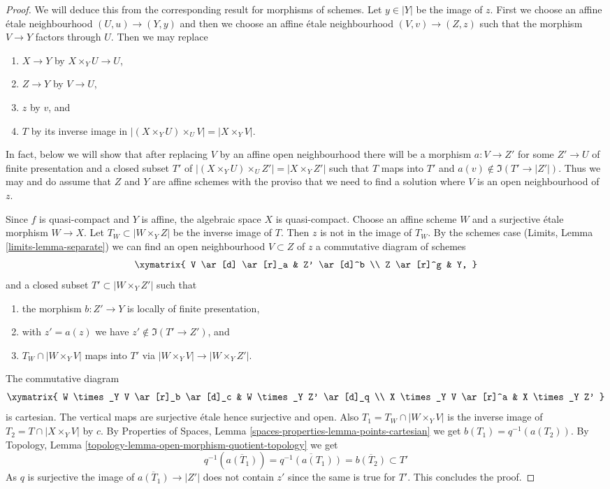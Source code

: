 \begin{proof}
We will deduce this from the corresponding result for morphisms of schemes.
Let $y \in |Y|$ be the image of $z$. First we choose an affine \'etale
neighbourhood $(U, u) \to (Y, y)$ and then we choose an affine \'etale
neighbourhood $(V, v) \to (Z, z)$ such that the morphism $V \to Y$
factors through $U$. Then we may replace
\begin{enumerate}
\item $X \to Y$ by $X \times_Y U \to U$,
\item $Z \to Y$ by $V \to U$,
\item $z$ by $v$, and
\item $T$ by its inverse image in
$|(X \times_Y U) \times_U V| = |X \times_Y V|$.
\end{enumerate}
In fact, below we will show that after replacing $V$ by an affine
open neighbourhood there will be a morphism $a : V \to Z'$ for
some $Z' \to U$ of finite presentation and a closed subset $T'$
of $|(X \times_Y U) \times_U Z'| = |X \times_Y Z'|$ such that
$T$ maps into $T'$ and $a(v) \not \in \Im(T' \to |Z'|)$.
Thus we may and do assume that $Z$ and $Y$ are affine schemes
with the proviso that we need to find a solution where $V$
is an open neighbourhood of $z$.

\medskip\noindent
Since $f$ is quasi-compact and $Y$ is affine, the algebraic space
$X$ is quasi-compact. Choose an affine scheme $W$ and a surjective
\'etale morphism $W \to X$. Let $T_W \subset |W \times_Y Z|$
be the inverse image of $T$. Then $z$ is not in the image of
$T_W$. By the schemes case (Limits, Lemma \ref{limits-lemma-separate})
we can find an open neighbourhood $V \subset Z$ of $z$
a commutative diagram of schemes
$$
\xymatrix{
V \ar[d] \ar[r]_a & Z' \ar[d]^b \\
Z \ar[r]^g & Y,
}
$$
and a closed subset $T' \subset |W \times_Y Z'|$ such that
\begin{enumerate}
\item the morphism $b : Z' \to Y$ is locally of finite presentation,
\item with $z' = a(z)$ we have $z' \not \in \Im(T' \to Z')$, and
\item $T_W \cap |W \times_Y V|$ maps into $T'$ via
$|W \times_Y V| \to |W \times_Y Z'|$.
\end{enumerate}
The commutative diagram
$$
\xymatrix{
W \times_Y V \ar[r]_b \ar[d]_c & W \times_Y Z' \ar[d]_q \\
X \times_Y V \ar[r]^a & X \times_Y Z'
}
$$
is cartesian. The vertical maps are surjective \'etale hence surjective
and open. Also $T_1 = T_W \cap |W \times_Y V|$ is the inverse image of
$T_2 = T \cap |X \times_Y V|$ by $c$. By Properties of Spaces, Lemma
\ref{spaces-properties-lemma-points-cartesian}
we get $b(T_1) = q^{-1}(a(T_2))$. By
Topology, Lemma \ref{topology-lemma-open-morphism-quotient-topology}
we get
$$
q^{-1}(\overline{a(T_1)}) = \overline{q^{-1}(a(T_1))} =
\overline{b(T_2)} \subset T'
$$
As $q$ is surjective the image of $\overline{a(T_1)} \to |Z'|$
does not contain $z'$ since the same is true for $T'$. This
concludes the proof.
\end{proof}

